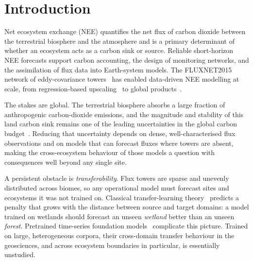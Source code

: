 \documentclass[sigconf]{acmart}          %
\begin{document}


\maketitle

\section{Introduction}

Net ecosystem exchange (NEE) quantifies the net flux of carbon dioxide
between the terrestrial biosphere and the atmosphere and is a primary
determinant of whether an ecosystem acts as a carbon sink or source.
Reliable short-horizon NEE forecasts support carbon accounting, the design
of monitoring networks, and the assimilation of flux data into Earth-system
models. The FLUXNET2015 network of eddy-covariance towers~\cite{pastorello2020fluxnet2015}
has enabled data-driven NEE modelling at scale, from regression-based
upscaling~\cite{tramontana2016predicting} to global products~\cite{jung2020scaling}.

The stakes are global. The terrestrial biosphere absorbs a large fraction of
anthropogenic carbon-dioxide emissions, and the magnitude and stability of this
land carbon sink remains one of the leading uncertainties in the global carbon
budget~\cite{friedlingstein2023global}. Reducing that uncertainty depends on
dense, well-characterised flux observations and on models that can forecast
fluxes where towers are absent, making the cross-ecosystem behaviour of those
models a question with consequences well beyond any single site.

A persistent obstacle is \emph{transferability}. Flux towers are sparse and
unevenly distributed across biomes, so any operational model must forecast
sites and ecosystems it was not trained on. Classical transfer-learning
theory~\cite{pan2010transfer,weiss2016transfer} predicts a penalty that
grows with the distance between source and target domains: a model trained on
wetlands should forecast an unseen \emph{wetland} better than an unseen
\emph{forest}. Pretrained time-series foundation models~\cite{cao2024tempo}
complicate this picture. Trained on large, heterogeneous corpora, their
cross-domain transfer behaviour in the geosciences, and across ecosystem
boundaries in particular, is essentially unstudied.
\end{document}
